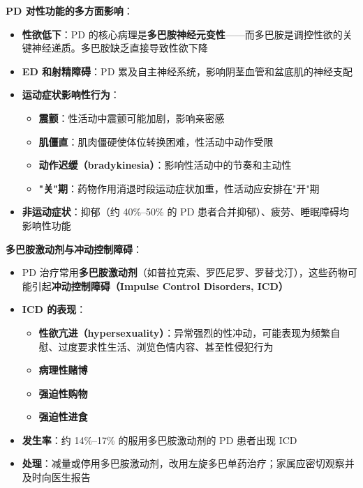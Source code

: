 \documentclass[12pt,a4paper,twoside]{ctexbook}
\begin{document}
\vspace{0.5em}
\noindent\textbf{PD 对性功能的多方面影响}：

\begin{itemize}[leftmargin=2cm]
	\item \textbf{性欲低下}：PD 的核心病理是\textbf{多巴胺神经元变性}——而多巴胺是调控性欲的关键神经递质。多巴胺缺乏直接导致性欲下降
	\item \textbf{ED 和射精障碍}：PD 累及自主神经系统，影响阴茎血管和盆底肌的神经支配
	\item \textbf{运动症状影响性行为}：
	\begin{itemize}
		\item \textbf{震颤}：性活动中震颤可能加剧，影响亲密感
		\item \textbf{肌僵直}：肌肉僵硬使体位转换困难，性活动中动作受限
		\item \textbf{动作迟缓（bradykinesia）}：影响性活动中的节奏和主动性
		\item \textbf{"关"期}：药物作用消退时段运动症状加重，性活动应安排在"开"期
	\end{itemize}
	\item \textbf{非运动症状}：抑郁（约 40\%--50\% 的 PD 患者合并抑郁）、疲劳、睡眠障碍均影响性功能
\end{itemize}

\vspace{0.5em}
\noindent\textbf{多巴胺激动剂与冲动控制障碍}：

\begin{itemize}[leftmargin=2cm]
	\item PD 治疗常用\textbf{多巴胺激动剂}（如普拉克索、罗匹尼罗、罗替戈汀），这些药物可能引起\textbf{冲动控制障碍（Impulse Control Disorders, ICD）}
	\item \textbf{ICD 的表现}：
	\begin{itemize}
		\item \textbf{性欲亢进（hypersexuality）}：异常强烈的性冲动，可能表现为频繁自慰、过度要求性生活、浏览色情内容、甚至性侵犯行为
		\item \textbf{病理性赌博}
		\item \textbf{强迫性购物}
		\item \textbf{强迫性进食}
	\end{itemize}
	\item \textbf{发生率}：约 14\%--17\% 的服用多巴胺激动剂的 PD 患者出现 ICD
	\item \textbf{处理}：减量或停用多巴胺激动剂，改用左旋多巴单药治疗；家属应密切观察并及时向医生报告
\end{itemize}
\end{document}
